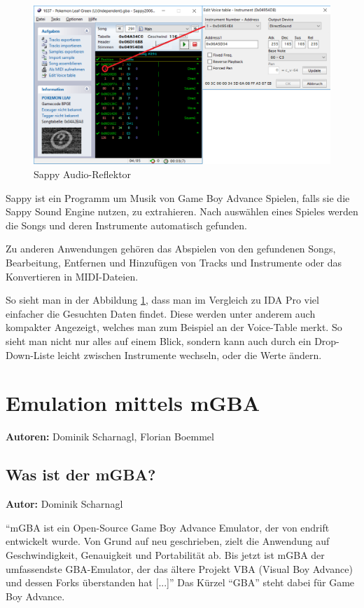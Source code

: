 \documentclass[11pt,a4paper]{scrartcl}
\newcommand{\AutorDominik} {
    \vspace{-4mm}
    \large \textbf{Autor:} Dominik Scharnagl \normalsize
    \vspace{2mm}
}
\newcommand{\AutorDominikFlorian} {
    \vspace{-4mm}
    \large \textbf{Autoren:} Dominik Scharnagl, Florian Boemmel \normalsize
    \vspace{2mm}
}
\begin{document}
\begin{figure}[h]
    \centering
    \includegraphics[width=\textwidth]{Sappy}
    \caption{Sappy Audio-Reflektor}
    \label{fig:Sappy}
\end{figure}

Sappy ist ein Programm um Musik von Game Boy Advance Spielen, falls sie die Sappy Sound Engine nutzen, zu extrahieren. Nach ausw\"ahlen eines Spieles werden die Songs und deren Instrumente automatisch gefunden.

Zu anderen Anwendungen geh\"oren das Abspielen von den gefundenen Songs, Bearbeitung, Entfernen und Hinzuf\"ugen von Tracks und Instrumente oder das Konvertieren in MIDI-Dateien.

So sieht man in der Abbildung \ref{fig:Sappy}, dass man im Vergleich zu IDA Pro viel einfacher die Gesuchten Daten findet. Diese werden unter anderem auch kompakter Angezeigt, welches man zum Beispiel an der Voice-Table merkt. So sieht man nicht nur alles auf einem Blick, sondern kann auch durch ein Drop-Down-Liste leicht zwischen Instrumente wechseln, oder die Werte \"andern.


\newpage


\section{Emulation mittels mGBA} \label{EmulationMittelsMGBA}
\AutorDominikFlorian


\subsection{Was ist der mGBA?}
\AutorDominik

\enquote{mGBA ist ein Open-Source Game Boy Advance Emulator, der von endrift entwickelt wurde. Von Grund auf neu geschrieben, zielt die Anwendung auf Geschwindigkeit, Genauigkeit und Portabilit\"at ab. Bis jetzt ist mGBA der umfassendste GBA-Emulator, der das \"altere Projekt VBA (Visual Boy Advance) und dessen Forks \"uberstanden hat [...]} \cite{mGBAWiki} Das K\"urzel \enquote{GBA} steht dabei f\"ur Game Boy Advance.
\end{document}

